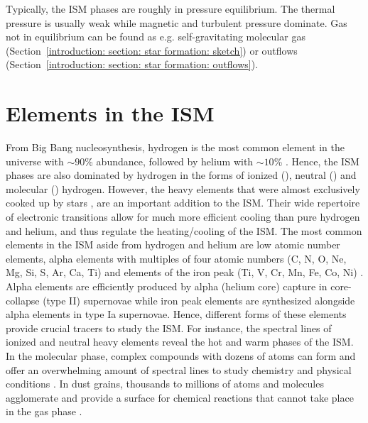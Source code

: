 Typically, the ISM phases are roughly in pressure equilibrium. The thermal pressure is usually weak while magnetic and turbulent pressure dominate.
Gas not in equilibrium can be found as e.g. self-gravitating molecular gas (Section~\ref{introduction: section: star formation: sketch}) or outflows (Section~\ref{introduction: section: star formation: outflows}).



\section{Elements in the ISM}
\label{introdution: section: ism: elements}

From Big Bang nucleosynthesis, hydrogen is the most common element in the universe with $\sim 90$\% abundance, followed by helium with $\sim 10$\% \citep[e.g.][]{1994ARA&A..32..191W}. Hence, the ISM phases are also dominated by hydrogen in the forms of ionized (\hii), neutral (\hi) and molecular (\htwo) hydrogen.
However, the heavy elements that were almost exclusively cooked up by stars \citep[e.g.][]{1988ccna.book.....R,2014PASA...31...30K}, are an important addition to the ISM. Their wide repertoire of electronic transitions allow for much more efficient cooling than pure hydrogen and helium, and thus regulate the heating/cooling of the ISM.
The most common elements in the ISM aside from hydrogen and helium are low atomic number elements, alpha elements with multiples of four atomic numbers (C, N, O, Ne, Mg, Si, S, Ar, Ca, Ti) and elements of the iron peak (Ti, V, Cr, Mn, Fe, Co, Ni) \citep[e.g.][]{1994ARA&A..32..191W}. 
Alpha elements are efficiently produced by alpha (helium core) capture in core-collapse (type II) supernovae while iron peak elements are synthesized alongside alpha elements in type Ia supernovae.
Hence, different forms of these elements provide crucial tracers to study the ISM. For instance, the spectral lines of ionized and neutral heavy elements reveal the hot and warm phases of the ISM. In the molecular phase, complex compounds with dozens of atoms can form and offer an overwhelming amount of spectral lines to study chemistry and physical conditions \citep[e.g.][]{1973ApJ...185..505H}. In dust grains, thousands to millions of atoms and molecules agglomerate and provide a surface for chemical reactions that cannot take place in the gas phase \citep[e.g.][]{2017MolAs...9....1W,2005JPhCS...6...18H}.


